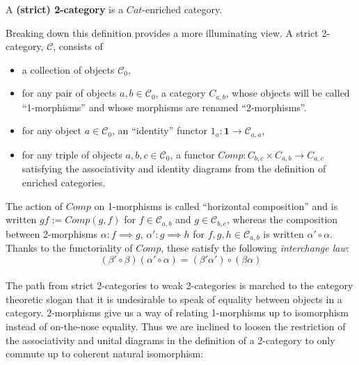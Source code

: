 \begin{defn}
  A \textbf{(strict) 2-category} is a $Cat$-enriched category.
\end{defn}
Breaking down this definition provides a more illuminating view. A strict 2-category, $\mathcal{C}$, consists of
\begin{itemize}
\item a collection of objects $\mathcal{C}_0$,
\item for any pair of objects $a, b \in \mathcal{C}_0$, a category $C_{a, b}$, whose objects will be called ``1-morphisms'' and whose morphisms are renamed ``2-morphisms''.
\item for any object $a \in \mathcal{C}_0$, an ``identity'' functor $1_a : \mathbf{1} \to \mathcal{C}_{a, a}$, 
\item for any triple of objects $a, b, c \in \mathcal{C}_0$, a functor $Comp : C_{b, c} \times C_{a, b} \to C_{a, c}$
  satisfying the associativity and identity diagrams from the definition of enriched categories.
\end{itemize}
The action of $Comp$ on 1-morphisms is called ``horizontal composition'' and is written $gf := Comp(g, f)$ for $f \in \mathcal{C}_{a, b}$ and $g \in \mathcal{C}_{b, c}$, whereas the composition between 2-morphisms $\alpha : f \implies g$, $\alpha' : g \implies h$ for $f, g, h \in \mathcal{C}_{a, b}$ is written $\alpha' \circ \alpha$.
Thanks to the functoriality of $Comp$, these satisfy the following \textit{interchange law}:
\[
  (\beta' \circ \beta)(\alpha'\circ \alpha)=(\beta'\alpha')\circ(\beta\alpha)
\]\\
The path from strict 2-categories to weak 2-categories is marched to the category theoretic slogan that it is undesirable to speak of equality between objects in a category. 2-morphisms give us a way of relating 1-morphisms up to isomorphism instead of on-the-nose equality. Thus we are inclined to loosen the restriction of the associativity and unital diagrams in the definition of a 2-category to only commute up to coherent natural isomorphism:

